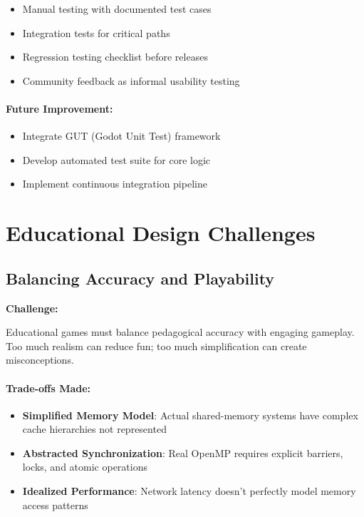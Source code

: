 \begin{itemize}
    \item Manual testing with documented test cases
    \item Integration tests for critical paths
    \item Regression testing checklist before releases
    \item Community feedback as informal usability testing
\end{itemize}

\paragraph*{Future Improvement:}

\begin{itemize}
    \item Integrate GUT (Godot Unit Test) framework
    \item Develop automated test suite for core logic
    \item Implement continuous integration pipeline
\end{itemize}

\section{Educational Design Challenges}
\label{sec:educational-challenges}

\subsection{Balancing Accuracy and Playability}
\label{subsec:accuracy-vs-playability}

\textbf{Challenge:}

Educational games must balance pedagogical accuracy with engaging gameplay. Too much realism can reduce fun; too much simplification can create misconceptions.

\paragraph*{Trade-offs Made:}

\begin{itemize}
    \item \textbf{Simplified Memory Model}: Actual shared-memory systems have complex cache hierarchies not represented
    \item \textbf{Abstracted Synchronization}: Real OpenMP requires explicit barriers, locks, and atomic operations
    \item \textbf{Idealized Performance}: Network latency doesn't perfectly model memory access patterns
\end{itemize}

